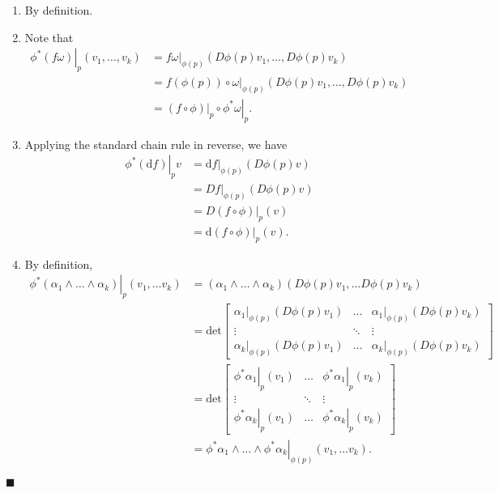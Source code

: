 \documentclass[letter-paper]{tufte-book}
\newenvironment{proof}[1][Proof]{\begin{trivlist}
\item[\hskip \labelsep {\bfseries #1}]}{\end{trivlist}}
\newcommand{\qed}{\hfill$\blacksquare$}
\begin{document}
\begin{proof}
  \begin{enumerate}
    \item By definition.
    
    \item Note that
    \begin{align*}
      \left.\phi^* (f\omega)\right|_p (v_1, \ldots, v_k) 
        &= \left.f\omega\right|_{\phi(p)}(D\phi(p) v_1, \ldots, D\phi(p) v_k)\\
        &= f(\phi(p)) \circ \left.\omega\right|_{\phi(p)}(D\phi(p) v_1, \ldots, D\phi(p) v_k)\\
        &= \left.(f \circ \phi)\right|_p \circ \left.\phi^*\omega\right|_{p}.
    \end{align*}
    
    \item Applying the standard chain rule in reverse, we have
    \begin{align*}
      \left.\phi^* (\mathrm{d}f)\right|_p v
        &= \left.\mathrm{d}f\right|_{\phi(p)}(D\phi(p) v)\\
        &= \left.Df\right|_{\phi(p)}(D\phi(p) v)\\
        &= \left.D(f \circ \phi)\right|_p (v)\\
        &= \left.\mathrm{d} (f \circ \phi)\right|_p (v).
    \end{align*}
    
    \item By definition,
    \begin{align*}
      \left.\phi^*(\alpha_1 \wedge \ldots \wedge \alpha_k)\right|_p (v_1, \ldots v_k) 
        &= (\alpha_1 \wedge \ldots \wedge \alpha_k) (D\phi(p) v_1, \ldots D\phi(p) v_k)\\
        &= \mbox{det}\left[
          \begin{matrix} 
            \left.\alpha_1\right|_{\phi(p)}(D\phi(p)v_1) & \ldots & \left.\alpha_1\right|_{\phi(p)}(D\phi(p)v_k) \\ 
            \vdots & \ddots & \vdots\\
            \left.\alpha_k\right|_{\phi(p)}(D\phi(p)v_1) & \ldots & \left.\alpha_k\right|_{\phi(p)}(D\phi(p)v_k)
          \end{matrix}\right]\\
        &= \mbox{det}\left[
          \begin{matrix} 
            \left.\phi^*\alpha_1\right|_{p}(v_1) & \ldots & \left.\phi^*\alpha_1\right|_{p}(v_k) \\ 
            \vdots & \ddots & \vdots\\
            \left.\phi^*\alpha_k\right|_{p}(v_1) & \ldots & \left.\phi^*\alpha_k\right|_{p}(v_k)
          \end{matrix}\right]\\
        &= \left.\phi^* \alpha_1 \wedge \ldots \wedge \phi^* \alpha_k\right|_{\phi(p)} (v_1, \ldots v_k).
    \end{align*}
  \end{enumerate}
  \qed
\end{proof}
\end{document}
